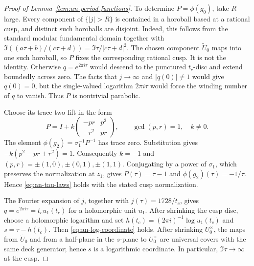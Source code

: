 \begin{proof}[Proof of Lemma~\ref{lem:an-period-functions}]
To determine $P=\phi(g_0)$, take $R$ large.  Every component
of $\{|j|>R\}$ is contained in a horoball based at a rational cusp, and
distinct such horoballs are disjoint.  Indeed, this follows from the
standard modular fundamental domain together with
$\Im((a\tau+b)/(c\tau+d))=\Im\tau/|c\tau+d|^2$.
The chosen component $\widetilde U_0$ maps into one such horoball, so $P$
fixes the corresponding rational cusp.  It is not the identity.  Otherwise
$q=e^{2\pi i\tau}$ would descend to the punctured $t_c$-disc and
extend boundedly across zero.  The facts that $j\to\infty$ and
$|q(0)|\ne1$ would give $q(0)=0$, but the single-valued logarithm
$2\pi i\tau$ would force the winding number of $q$ to vanish.  Thus
$P$ is nontrivial parabolic.

Choose its trace-two lift in the form
\[
 P=I+k
 \begin{pmatrix}
 -pr&p^2\\-r^2&pr
 \end{pmatrix},
 \qquad \gcd(p,r)=1,\quad k\ne0.
\]
The element $\phi(g_2)=\sigma_1^{-1}P^{-1}$ has trace zero.  Substitution
gives $-k(p^2-pr+r^2)=1$.
Consequently $k=-1$ and
$(p,r)=\pm(1,0),\pm(0,1),\pm(1,1)$.  Conjugating by a power of $\sigma_1$,
which preserves the normalization at $z_1$, gives
$P(\tau)=\tau-1$ and $\phi(g_2)(\tau)=-1/\tau$.
Hence \eqref{eq:an-tau-laws} holds with the stated cusp normalization.

The Fourier expansion of $j$, together with
$j(\tau)=1728/t_c$, gives $q=e^{2\pi i\tau}=t_cu_1(t_c)$
for a holomorphic unit $u_1$.  After shrinking the cusp disc, choose a
holomorphic logarithm and set
$h(t_c)=(2\pi i)^{-1}\log u_1(t_c)$ and $s=\tau-h(t_c)$.
Then \eqref{eq:an-log-coordinate} holds.  After shrinking $U_0^\times$, the
maps from $\widetilde U_0$ and from a half-plane in the $s$-plane to
$U_0^\times$ are universal covers with the same deck generator; hence
$s$ is a logarithmic coordinate.  In particular,
$\Im\tau\to\infty$ at the cusp.


\end{proof}
